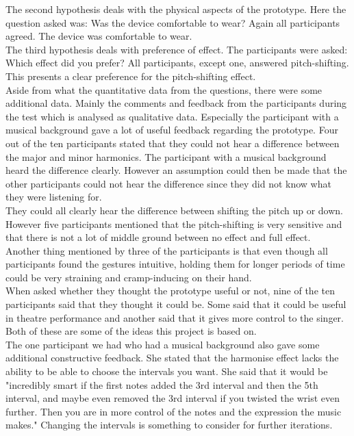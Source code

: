 The second hypothesis deals with the physical aspects of the prototype. Here the question asked was: Was the device comfortable to wear? Again all participants agreed. The device was comfortable to wear. \\

The third hypothesis deals with preference of effect. The participants were asked: Which effect did you prefer? All participants, except one, answered pitch-shifting. This presents a clear preference for the pitch-shifting effect. \\

Aside from what the quantitative data from the questions, there were some additional data. Mainly the comments and feedback from the participants during the test which is analysed as qualitative data. Especially the participant with a musical background gave a lot of useful feedback regarding the prototype. Four out of the ten participants stated that they could not hear a difference between the major and minor harmonics. The participant with a musical background heard the difference clearly. However an assumption could then be made that the other participants could not hear the difference since they did not know what they were listening for. \\

They could all clearly hear the difference between shifting the pitch up or down. However five participants mentioned that the pitch-shifting is very sensitive and that there is not a lot of middle ground between no effect and full effect. \\

Another thing mentioned by three of the participants is that even though all participants found the gestures intuitive, holding them for longer periods of time could be very straining and cramp-inducing on their hand. \\

When asked whether they thought the prototype useful or not, nine of the ten participants said that they thought it could be. Some said that it could be useful in theatre performance and another said that it gives more control to the singer. Both of these are some of the ideas this project is based on. \\

The one participant we had who had a musical background also gave some additional constructive feedback. She stated that the harmonise effect lacks the ability to be able to choose the intervals you want. She said that it would be "incredibly smart if the first notes added the 3rd interval and then the 5th interval, and maybe even removed the 3rd interval if you twisted the wrist even further. Then you are in more control of the notes and the expression the music makes." Changing the intervals is something to consider for further iterations. 

